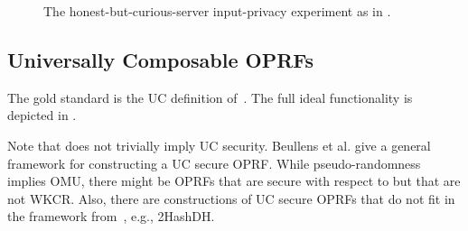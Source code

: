 \begin{figure}
    \caption{The honest-but-curious-server input-privacy experiment as in \cite{EC:TCRSTW22}.}
    \label{fig:exp-original-server-priv}
\end{figure}


\subsection{Universally Composable OPRFs}
The gold standard is the UC definition of~\cite{ESP:JKKX16}.
The full ideal functionality is depicted in .

Note that  does not trivially imply UC security.
Beullens et al. give a general framework for constructing a UC secure OPRF. While pseudo-randomness implies OMU, there might be OPRFs that are secure with respect to  but that are not WKCR.
Also, there are constructions of UC secure OPRFs that do not fit in the
framework from~\cite{EPRINT:BeuFalHes24}, e.g., 2HashDH.




